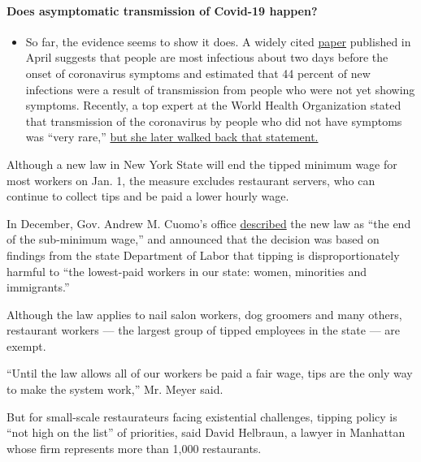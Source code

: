 \begin{itemize}
{  \paragraph{Does asymptomatic transmission of Covid-19
  happen?}\label{does-asymptomatic-transmission-of-covid-19-happen}}

  \begin{itemize}
  \tightlist
  \item
    So far, the evidence seems to show it does. A widely cited
    \href{https://www.nature.com/articles/s41591-020-0869-5}{paper}
    published in April suggests that people are most infectious about
    two days before the onset of coronavirus symptoms and estimated that
    44 percent of new infections were a result of transmission from
    people who were not yet showing symptoms. Recently, a top expert at
    the World Health Organization stated that transmission of the
    coronavirus by people who did not have symptoms was ``very rare,''
    \href{https://www.nytimes3xbfgragh.onion/2020/06/09/world/coronavirus-updates.html?action=click\&pgtype=Article\&state=default\&region=MAIN_CONTENT_3\&context=storylines_faq\#link-1f302e21}{but
    she later walked back that statement.}
  \end{itemize}
\end{itemize}

Although a new law in New York State will end the tipped minimum wage
for most workers on Jan. 1, the measure excludes restaurant servers, who
can continue to collect tips and be paid a lower hourly wage.

In December, Gov. Andrew M. Cuomo's office
\href{https://www.governor.ny.gov/news/governor-cuomo-announces-end-subminimum-wage-across-miscellaneous-industries-statewide}{described}
the new law as ``the end of the sub-minimum wage,'' and announced that
the decision was based on findings from the state Department of Labor
that tipping is disproportionately harmful to ``the lowest-paid workers
in our state: women, minorities and immigrants.''

Although the law applies to nail salon workers, dog groomers and many
others, restaurant workers --- the largest group of tipped employees in
the state --- are exempt.

``Until the law allows all of our workers be paid a fair wage, tips are
the only way to make the system work,'' Mr. Meyer said.

But for small-scale restaurateurs facing existential challenges, tipping
policy is ``not high on the list'' of priorities, said David Helbraun, a
lawyer in Manhattan whose firm represents more than 1,000 restaurants.

